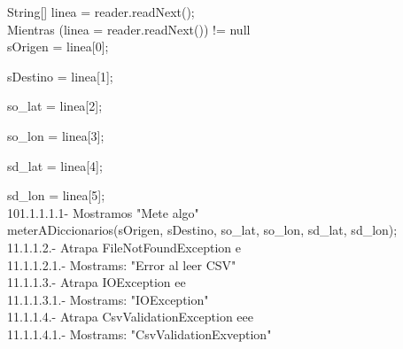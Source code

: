 \documentclass[30pt]{article}
\theoremstyle{definition}
\begin{document}
    \hspace{6cm} String[] linea = reader.readNext();\\
    
    \hspace{6cm} Mientras (linea = reader.readNext()) != null \\
    
    \hspace{7cm} sOrigen  = linea[0];
    
  \hspace{7cm} sDestino  = linea[1];
  
  \hspace{7cm} so\_lat  = linea[2];
  
  \hspace{7cm} so\_lon  = linea[3];
  
  \hspace{7cm} sd\_lat  = linea[4];
  
  \hspace{7cm} sd\_lon  = linea[5];\\
  
  \hspace{7cm} 101.1.1.1.1- Mostramos "Mete algo"\\

  \hspace{7cm} meterADiccionarios(sOrigen, sDestino, so\_lat, so\_lon, sd\_lat, sd\_lon);\\
  
  \hspace{4cm} 11.1.1.2.- Atrapa FileNotFoundException e\\
  
  \hspace{5cm} 11.1.1.2.1.- Mostrams: "Error al leer CSV"\\
  
  \hspace{4cm} 11.1.1.3.- Atrapa IOException ee\\
  
  \hspace{5cm} 11.1.1.3.1.- Mostrams: "IOException"\\
  
  \hspace{4cm} 11.1.1.4.- Atrapa CsvValidationException eee\\
  
  \hspace{5cm} 11.1.1.4.1.- Mostrams: "CsvValidationExveption"\\
  
\end{document}
